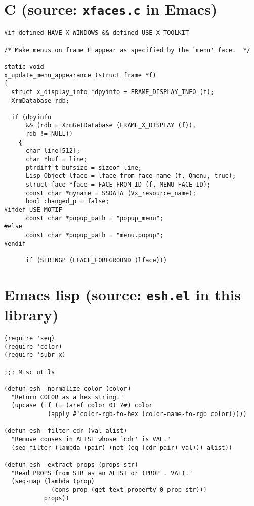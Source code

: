\documentclass{article}
\begin{document}
\section*{C (source: \texttt{xfaces.c} in Emacs)}

\begin{verbatim}
#if defined HAVE_X_WINDOWS && defined USE_X_TOOLKIT

/* Make menus on frame F appear as specified by the `menu' face.  */

static void
x_update_menu_appearance (struct frame *f)
{
  struct x_display_info *dpyinfo = FRAME_DISPLAY_INFO (f);
  XrmDatabase rdb;

  if (dpyinfo
      && (rdb = XrmGetDatabase (FRAME_X_DISPLAY (f)),
      rdb != NULL))
    {
      char line[512];
      char *buf = line;
      ptrdiff_t bufsize = sizeof line;
      Lisp_Object lface = lface_from_face_name (f, Qmenu, true);
      struct face *face = FACE_FROM_ID (f, MENU_FACE_ID);
      const char *myname = SSDATA (Vx_resource_name);
      bool changed_p = false;
#ifdef USE_MOTIF
      const char *popup_path = "popup_menu";
#else
      const char *popup_path = "menu.popup";
#endif

      if (STRINGP (LFACE_FOREGROUND (lface)))
\end{verbatim}

\section*{Emacs lisp (source: \texttt{esh.el} in this library)}

\begin{verbatim}
(require 'seq)
(require 'color)
(require 'subr-x)

;;; Misc utils

(defun esh--normalize-color (color)
  "Return COLOR as a hex string."
  (upcase (if (= (aref color 0) ?#) color
            (apply #'color-rgb-to-hex (color-name-to-rgb color)))))

(defun esh--filter-cdr (val alist)
  "Remove conses in ALIST whose `cdr' is VAL."
  (seq-filter (lambda (pair) (not (eq (cdr pair) val))) alist))

(defun esh--extract-props (props str)
  "Read PROPS from STR as an ALIST or (PROP . VAL)."
  (seq-map (lambda (prop)
             (cons prop (get-text-property 0 prop str)))
           props))
\end{verbatim}

\clearpage
\end{document}
